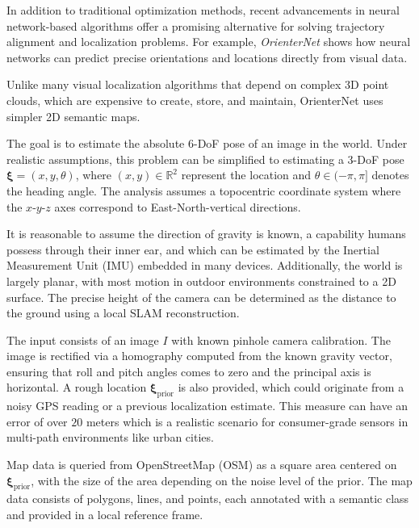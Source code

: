 In addition to traditional optimization methods, recent advancements in neural network-based algorithms offer a promising alternative for solving trajectory alignment and localization problems. For example, \textit{OrienterNet} \cite{sarlin2023orienternetvisuallocalization2d} shows how neural networks can predict precise orientations and locations directly from visual data.

Unlike many visual localization algorithms that depend on complex 3D point clouds, which are expensive to create, store, and maintain, OrienterNet uses simpler 2D semantic maps. 

The goal is to estimate the absolute 6-DoF pose of an image in the world. Under realistic assumptions, this problem can be simplified to estimating a 3-DoF pose \( \boldsymbol{\xi} = (x, y, \theta) \), where \((x, y) \in \mathbb{R}^2\) represent the location and \(\theta \in (-\pi, \pi]\) denotes the heading angle. The analysis assumes a topocentric coordinate system where the \(x\)-\(y\)-\(z\) axes correspond to East-North-vertical directions.

It is reasonable to assume the direction of gravity is known, a capability humans possess through their inner ear, and which can be estimated by the Inertial Measurement Unit (IMU) embedded in many devices. Additionally, the world is largely planar, with most motion in outdoor environments constrained to a 2D surface. The precise height of the camera can be determined as the distance to the ground using a local SLAM reconstruction.

The input consists of an image \( I \) with known pinhole camera calibration. The image is rectified via a homography computed from the known gravity vector, ensuring that roll and pitch angles comes to zero and the principal axis is horizontal. A rough location \( \boldsymbol{\xi}_{\text{prior}} \) is also provided, which could originate from a noisy GPS reading or a previous localization estimate. This measure can have an error of over $20$ meters which is a realistic scenario for consumer-grade sensors in multi-path environments like urban cities.

Map data is queried from OpenStreetMap (OSM) as a square area centered on \( \boldsymbol{\xi}_{\text{prior}} \), with the size of the area depending on the noise level of the prior. The map data consists of polygons, lines, and points, each annotated with a semantic class and provided in a local reference frame.

